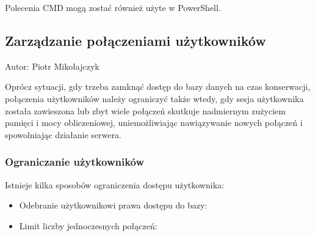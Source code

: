 \documentclass[a4paper,11pt,openany,english]{sphinxmanual}
\begin{document}
\sphinxAtStartPar
Polecenia CMD mogą zostać również użyte w PowerShell.


\subsection{Zarządzanie połączeniami użytkowników}
\label{\detokenize{rozdzial2/Kontrola_i_konserwacja/kontrola_i_konserwacja:zarzadzanie-polaczeniami-uzytkownikow}}
\sphinxAtStartPar
Autor: Piotr Mikołajczyk

\sphinxAtStartPar
Oprócz sytuacji, gdy trzeba zamknąć dostęp do bazy danych na czas konserwacji, połączenia użytkowników należy ograniczyć także wtedy, gdy sesja użytkownika została zawieszona lub zbyt wiele połączeń skutkuje nadmiernym zużyciem pamięci i mocy obliczeniowej, uniemożliwiając nawiązywanie nowych połączeń i spowolniając działanie serwera.


\subsubsection{Ograniczanie użytkowników}
\label{\detokenize{rozdzial2/Kontrola_i_konserwacja/kontrola_i_konserwacja:ograniczanie-uzytkownikow}}
\sphinxAtStartPar
Istnieje kilka sposobów ograniczenia dostępu użytkownika:
\begin{itemize}
\item {} 
\sphinxAtStartPar
Odebranie użytkownikowi prawa dostępu do bazy:
\begin{quote}

\begin{sphinxVerbatim}[commandchars=\\\{\}]
\end{sphinxVerbatim}
\end{quote}

\item {} 
\sphinxAtStartPar
Limit liczby jednoczesnych połączeń:
\begin{quote}

\begin{sphinxVerbatim}[commandchars=\\\{\}]
\end{sphinxVerbatim}
\end{quote}

\end{itemize}
\end{document}
